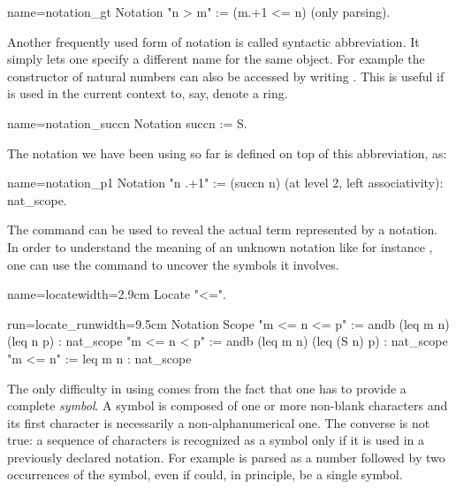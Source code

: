 \begin{coq}{name=notation_gt}{}
Notation "n > m"  := (m.+1 <= n) (only parsing).
\end{coq}

Another frequently used form of notation is called syntactic abbreviation.
It simply lets one specify a different name for the same object.
For example the  constructor of natural numbers can also be accessed
by writing .  This is useful if  is used in the current context
to, say, denote a ring.

\begin{coq}{name=notation_succn}{}
Notation succn := S.
\end{coq}

The notation  we have been using so far is defined on top of
this abbreviation, as:

\begin{coq}{name=notation_p1}{}
Notation "n .+1" := (succn n) (at level 2, left associativity): nat_scope.
\end{coq}


The  command can be used to reveal the actual term
represented by a notation.  In order to understand the meaning of an unknown notation like for instance , one can use the  command to uncover the symbols it involves.

\begin{coq}{name=locate}{width=2.9cm}
Locate "<=".
\end{coq}
\begin{coqout}{run=locate_run}{width=9.5cm}
Notation                                       Scope
"m <= n <= p" := andb (leq m n) (leq n p)    : nat_scope
"m <= n < p" := andb (leq m n) (leq (S n) p) : nat_scope
"m <= n" := leq m n                          : nat_scope
\end{coqout}

The only difficulty in using  comes from the fact
that one has to provide a complete \emph{symbol}.  A symbol
is composed of one or more non-blank characters and its first
character is necessarily a non-alphanumerical one.
The converse is not true: a sequence of characters is recognized as
a symbol only if it is used in a previously declared notation.
For example  is parsed as a number followed by two
occurrences of the  symbol, even if  could, in
principle, be a single symbol.

